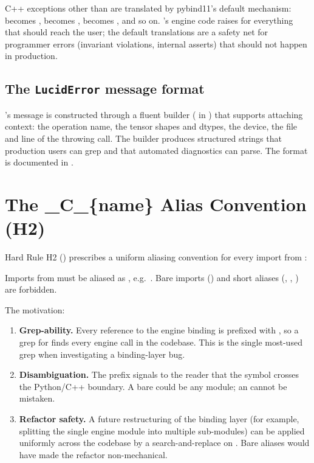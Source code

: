 C++ exceptions other than  are translated by
pybind11's default mechanism: 
becomes ,  becomes
,  becomes
, and so on. \Lucid's engine code raises
 for everything that should reach the user; the
default translations are a safety net for programmer errors
(invariant violations, internal asserts) that should not happen in
production.

\subsection{The \texttt{LucidError} message format}
\label{ssec:python_cpp_binding:error_format}

's message is constructed through a fluent builder
( in ) that supports
attaching context: the operation name, the tensor shapes and
dtypes, the device, the file and line of the throwing call. The
builder produces structured strings that production users can grep
and that automated diagnostics can parse. The format is documented
in .

\section{The \_C\_\{name\} Alias Convention (H2)}
\label{sec:python_cpp_binding:h2_alias}

Hard Rule H2 () prescribes a uniform
aliasing convention for every import from :

\begin{lucidrule}
Imports from  must be aliased as
, e.g.\ . Bare imports () and
short aliases (, , ) are
forbidden.
\end{lucidrule}

The motivation:

\begin{enumerate}
  \item \textbf{Grep-ability.} Every reference to the engine
    binding is prefixed with , so a grep for
     finds every engine call in the codebase. This is
    the single most-used grep when investigating a binding-layer
    bug.
  \item \textbf{Disambiguation.} The  prefix signals
    to the reader that the symbol crosses the Python/C++ boundary.
    A bare  could be any module; an
     cannot be mistaken.
  \item \textbf{Refactor safety.} A future restructuring of the
    binding layer (for example, splitting the single engine
    module into multiple sub-modules) can be applied uniformly
    across the codebase by a search-and-replace on .
    Bare aliases would have made the refactor non-mechanical.
\end{enumerate}

